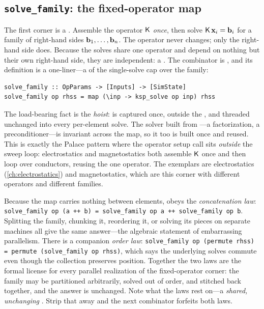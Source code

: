 \subsection{\texttt{solve\_family}: the fixed-operator map}

The first corner is a . Assemble the operator $\mathsf{K}$ \emph{once}, then
solve $\mathsf{K}\,\mathbf{x}_i = \mathbf{b}_i$ for a family of right-hand sides $\mathbf{b}_1,\dots,\mathbf{b}_n$.
The operator never changes; only the right-hand side does. Because the solves
share one operator and depend on nothing but their own right-hand side, they are
independent: a . The combinator is , and its
definition is a one-liner---a  of the single-solve cap over the family:
\begin{lstlisting}[style=l4style]
solve_family :: OpParams -> [Inputs] -> [SimState]
solve_family op rhss = map (\inp -> ksp_solve op inp) rhss
\end{lstlisting}
The load-bearing fact is the \emph{hoist}:  is captured once, outside the
, and threaded unchanged into every per-element solve. The solver built
from ---a factorization, a preconditioner---is invariant across the map,
so it too is built once and reused. This is exactly the Palace pattern where the
operator setup call sits \emph{outside} the sweep loop: electrostatics and
magnetostatics both assemble $\mathsf{K}$ once and then loop over conductors, reusing the
one operator. The exemplars are electrostatics (\cref{ch:electrostatics}) and
magnetostatics, which are this corner with different operators and different
families.

Because the map carries nothing between elements,  obeys the
\emph{concatenation law}: \lstinline[style=l4style]|solve_family op (a ++ b) = solve_family op a ++ solve_family op b|.
Splitting the family, chunking it, reordering it, or solving its pieces on separate
machines all give the same answer---the algebraic statement of embarrassing
parallelism. There is a companion \emph{order law}:
\lstinline[style=l4style]|solve_family op (permute rhss) = permute (solve_family op rhss)|,
which says the underlying solves commute even though the collection preserves
position. Together the two laws are the formal license for every parallel
realization of the fixed-operator corner: the family may be partitioned arbitrarily,
solved out of order, and stitched back together, and the answer is unchanged. Note
what the laws rest on---a \emph{shared, unchanging} . Strip that away and
the next combinator forfeits both laws.

